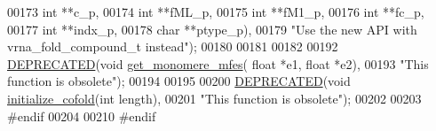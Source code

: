 \begin{DoxyCode}
00173                                       \textcolor{keywordtype}{int} **c\_p,
00174                                       \textcolor{keywordtype}{int} **fML\_p,
00175                                       \textcolor{keywordtype}{int} **fM1\_p,
00176                                       \textcolor{keywordtype}{int} **fc\_p,
00177                                       \textcolor{keywordtype}{int} **indx\_p,
00178                                       \textcolor{keywordtype}{char} **ptype\_p),
00179           \textcolor{stringliteral}{"Use the new API with vrna\_fold\_compound\_t instead"});
00180 
00181 
00182 
00192 \mbox{\hyperlink{cofold_8h_aab347a3c03fbe8e7319551b9fa0cce4a}{DEPRECATED}}(\textcolor{keywordtype}{void} \mbox{\hyperlink{group__mfe__cofold_ga4958b517c613e4d2afd5bce6c1060a79}{get\_monomere\_mfes}}( \textcolor{keywordtype}{float} *e1, \textcolor{keywordtype}{float} *e2),
00193           \textcolor{stringliteral}{"This function is obsolete"});
00194 
00195 
00200 \mbox{\hyperlink{cofold_8h_aab347a3c03fbe8e7319551b9fa0cce4a}{DEPRECATED}}(\textcolor{keywordtype}{void} \mbox{\hyperlink{group__mfe__cofold_gafee0c32208aa2ac97338b6e3fbad7fa5}{initialize\_cofold}}(\textcolor{keywordtype}{int} length),
00201           \textcolor{stringliteral}{"This function is obsolete"});
00202 
00203 \textcolor{preprocessor}{#endif}
00204 
00210 \textcolor{preprocessor}{#endif}
\end{DoxyCode}
